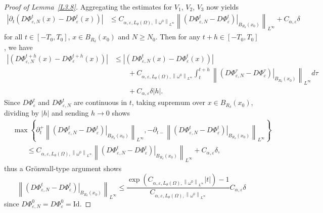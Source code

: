 \documentclass[reqno,centertags,12pt]{amsart}
\theoremstyle{definition}
\numberwithin{equation}{section}
\newcommand{\abs}[1]{\left\lvert#1\right\rvert}
\newcommand{\norm}[1]{\left\|#1\right\|}
\newcommand{\set}[1]{\left\{ #1 \right\}}
\newcommand{\eps}{\varepsilon}
\newcommand{\tht}{\theta}
\begin{document}
\begin{proof}[Proof of Lemma~\ref{L3.8}]
    Aggregating the estimates for $V_{1}$, $V_{2}$, $V_{3}$ now yields
    \begin{align*}
        \abs{\partial_{t}\left(
            D\Phi_{\eps,N}^{t}(x) - D\Phi_{\eps}^{t}(x)
        \right)} &\leq C_{\alpha,\eps,L_{\tht}(\Omega),\norm{\omega^{0}}_{L^{\infty}}}
        \norm{\left.\left(D\Phi_{\eps,N}^{t}
        - D\Phi_{\eps}^{t}\right)\right|_{B_{R_{\delta}}(x_{0})}}_{L^{\infty}}
        + C_{\alpha,\eps}\delta
    \end{align*}
    for all $t\in[-T_{0},T_{0}]$, $x\in B_{R_{\delta}}(x_{0})$ and $N\geq N_{0}$.
    Then for any $t+h\in[-T_{0},T_{0}]$, we have
    \begin{align*}
        \abs{\left(
            D\Phi_{\eps,N}^{t+h}(x) - D\Phi_{\eps}^{t+h}(x)
        \right)}
        &\leq \abs{\left(
            D\Phi_{\eps,N}^{t}(x) - D\Phi_{\eps}^{t}(x)
        \right)}
        \\&\quad\quad
        + C_{\alpha,\eps,L_{\tht}(\Omega),\norm{\omega^{0}}_{L^{\infty}}}\int_{t}^{t+h}
        \norm{\left.\left(D\Phi_{\eps,N}^{\tau}
        - D\Phi_{\eps}^{\tau}\right)\right|_{B_{R_{\delta}}(x_{0})}}_{L^{\infty}}
        d\tau
        \\&\quad\quad
        + C_{\alpha,\eps}\delta\abs{h}.
    \end{align*}
    Since $D\Phi_{\eps}^{t}$ and $D\Phi_{\eps,N}^{t}$ are continuous in $t$,
    taking supremum over $x\in B_{R_{\delta}}(x_{0})$,
    dividing by $\abs{h}$ and sending $h \to 0$ shows
    \begin{align*}
        &\max\set{
            \partial_{t}^{+}\norm{\left.\left(D\Phi_{\eps,N}^{t}
            - D\Phi_{\eps}^{t}\right)\right|_{B_{R_{\delta}}(x_{0})}}_{L^{\infty}},
            -\partial_{t-}\norm{\left.\left(D\Phi_{\eps,N}^{t}
            - D\Phi_{\eps}^{t}\right)\right|_{B_{R_{\delta}}(x_{0})}}_{L^{\infty}}
        }
        \\&\quad\quad\leq
        C_{\alpha,\eps,L_{\tht}(\Omega),\norm{\omega^{0}}_{L^{\infty}}}
        \norm{\left.\left(D\Phi_{\eps,N}^{t}
        - D\Phi_{\eps}^{t}\right)\right|_{B_{R_{\delta}}(x_{0})}}_{L^{\infty}}
        + C_{\alpha,\eps}\delta,
    \end{align*}
    thus a Gr\"{o}nwall-type argument shows
    \[
        \norm{\left.\left(D\Phi_{\eps,N}^{t}
        - D\Phi_{\eps}^{t}\right)\right|_{B_{R_{\delta}}(x_{0})}}_{L^{\infty}}
        \leq \frac{\exp(C_{\alpha,\eps,L_{\tht}(\Omega),\norm{\omega^{0}}_{L^{\infty}}}\abs{t}) - 1}
        {C_{\alpha,\eps,L_{\tht}(\Omega),\norm{\omega^{0}}_{L^{\infty}}}}
        C_{\alpha,\eps}\delta
    \]
    since $D\Phi_{\eps,N}^{0} = D\Phi_{\eps}^{0} = \mathrm{Id}$.


\end{proof}
\end{document}
